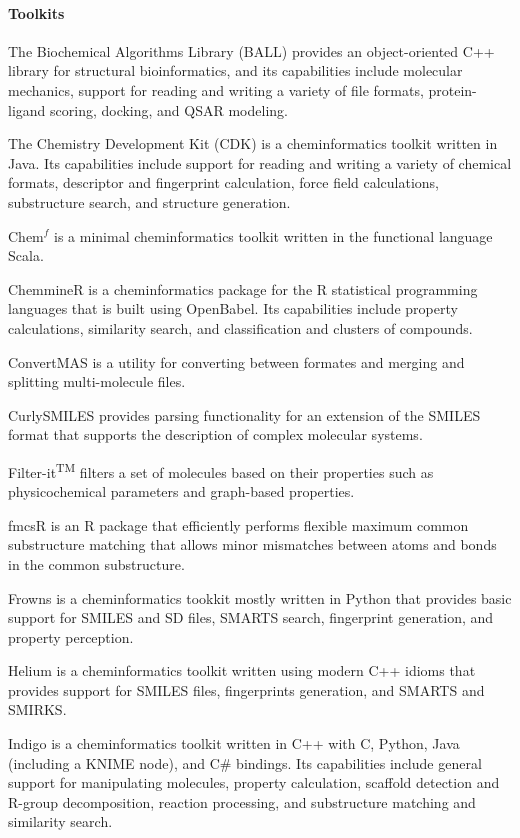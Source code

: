 \paragraph{Toolkits}
The Biochemical Algorithms Library (BALL) \cite{Hildebrandt_2010} provides an object-oriented C++ library for structural bioinformatics, and its capabilities include molecular mechanics, support for reading and writing a variety of file formats, protein-ligand scoring, docking, and QSAR modeling.

The Chemistry Development Kit (CDK) \cite{Steinbeck_2006} is a cheminformatics toolkit written in Java.  Its capabilities include support for reading and writing a variety of chemical formats, descriptor and fingerprint calculation, force field calculations, substructure search, and structure generation.

Chem$^f$ \cite{H_ck_2012} is a minimal cheminformatics toolkit written in the functional language Scala.

ChemmineR \cite{Cao_2008}  is a cheminformatics package for the R statistical programming languages that is built using OpenBabel. Its capabilities include property calculations, similarity search, and classification and clusters of compounds.

ConvertMAS is a utility for converting between formates and merging and splitting multi-molecule files.

CurlySMILES \cite{Drefahl_2011} provides parsing functionality for an extension of the SMILES format that supports the description of complex molecular systems.

Filter-it\textsuperscript{TM} filters a set of molecules based on their properties such as physicochemical parameters and graph-based properties. 

fmcsR \cite{Goecks_2010} is an R package that efficiently performs flexible maximum common substructure matching that allows minor mismatches between atoms and bonds in the common substructure.

Frowns is a cheminformatics tookkit mostly written in Python that provides basic support for SMILES and SD files, SMARTS search, fingerprint generation, and property perception.

Helium is a cheminformatics toolkit written using modern C++ idioms that provides support for SMILES files, fingerprints generation, and SMARTS and SMIRKS.

Indigo \cite{Pavlov_2011} is a cheminformatics toolkit written in C++ with C, Python, Java (including a KNIME node), and C# bindings.  Its capabilities include general support for manipulating molecules, property calculation, scaffold detection and R-group decomposition, reaction processing, and substructure matching and similarity search.


